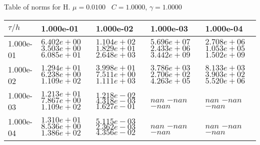 \begin{center}
Table of norms for H. $\mu = 0.0100$ \, $C = 1.0000$, $\gamma = 1.0000$
  
\begin{tabular}{|p{1in}|p{1in}|p{1in}|p{1in}|p{1in}|} \hline
$\tau / h$ &1.000e-01 &1.000e-02 &1.000e-03 &1.000e-04 \\ \hline 
1.000e-01 & $6.402e+00$  $3.503e+00$  $6.085e+01$  & $1.104e+02$  $1.829e+01$  $2.648e+03$  & $5.696e+07$  $2.433e+06$  $3.442e+09$  & $2.708e+06$  $1.053e+05$  $1.502e+09$  \\ \hline 
1.000e-02 & $1.294e+01$  $6.238e+00$  $1.109e+02$  & $3.998e+01$  $7.511e+00$  $1.111e+03$  & $3.786e+03$  $2.706e+02$  $4.263e+05$  & $8.133e+03$  $3.903e+02$  $5.520e+06$  \\ \hline 
1.000e-03 & $1.213e+01$  $7.867e+00$  $1.109e+02$  & $1.218e-02$  $4.318e-03$  $1.627e-01$  & $nan$  $-nan$  $-nan$  & $nan$  $-nan$  $-nan$  \\ \hline 
1.000e-04 & $1.310e+01$  $8.536e+00$  $1.386e+02$  & $5.115e-03$  $2.362e-03$  $4.356e-02$  & $nan$  $-nan$  $-nan$  & $nan$  $-nan$  $-nan$  \\ \hline 

\end{tabular}\\[20pt]
\end{center}
